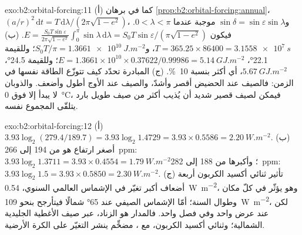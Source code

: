 \begin{solution}{exo:b2:orbital-forcing:11}
(أ) كما في برهان \cref{prop:b2:orbital-forcing:annual}، $(a/r)^2\,\mathrm dt =
T\,\mathrm d\lambda/(2\pi\sqrt{1 - e^2})$، و$\sin\delta = \sin\varepsilon\sin\lambda$ موجبة
عندما $0 < \lambda < \pi$. فيكون $E = \frac{S_0T\sin\varepsilon}{2\pi\sqrt{1 - e^2}}\int_0^{\pi}\sin\lambda
\,\mathrm d\lambda = S_0T\sin\varepsilon/(\pi\sqrt{1 - e^2})$. (ب) $T = 365.25 \times 86400 =
\qty{3.1558e7}{s}$، و$S_0T/\pi = \qty{1.3661e10}{J.m^{-2}}$؛ وللقيمة \ang{22.1}، $E = 1.3661 \times 10^{10}
\times 0.37622/0.99986 = \qty{5.14}{GJ.m^{-2}}$؛ وللقيمة \ang{24.5}، $\qty{5.67}{GJ.m^{-2}}$،
أي أكثر بنسبة \qty{10}{\percent}. (ج) المبادرة تحدّد كيف تتوزّع الطاقة نفسها في الزمن: فالصيف
عند الحضيض أقصر وأشدّ، والصيف عند الأوج أطول وأضعف. والذوبان لا يبدأ
إلا فوق \qty{0}{\celsius}، فيمكن لصيف قصير شديد أن يُذيب أكثر من صيف طويل بارد
يتلقّى المجموع نفسه.
\end{solution}

\begin{solution}{exo:b2:orbital-forcing:12}
(أ) $3.93\log_2(279.4/189.7) = 3.93\log_2 1.4729 = 3.93 \times 0.5586 = \qty{2.20}{W.m^{-2}}$. (ب)
أصغر ارتفاع هو من 194 إلى \qty{266}{ppm}: $3.93\log_2 1.3711 = 3.93 \times 0.4554 =
\qty{1.79}{W.m^{-2}}$؛ وأكبرها من 188 إلى \qty{282}{ppm}: $3.93\log_2 1.5 = 3.93 \times 0.5850 =
\qty{2.30}{W.m^{-2}}$. (ج) تأثير ثنائي أكسيد الكربون أربعة أضعاف أكبر تغيّر في
الإشماس العالمي السنوي، \qty{0.54}{W.m^{-2}}، وهو يؤثّر في كلّ مكان وطوال السنة؛ أمّا الإشماس
الصيفي عند \ang{65} شمالًا فيتأرجح بنحو \qty{109}{W.m^{-2}}، لكن عند عرض واحد وفي فصل واحد.
فالمدار هو الزناد، عبر صيف الأغطية الجليدية الشمالية؛ وثنائي أكسيد الكربون، مع
، مضخِّم ينشر التغيّر على الكرة الأرضية.
\end{solution}

